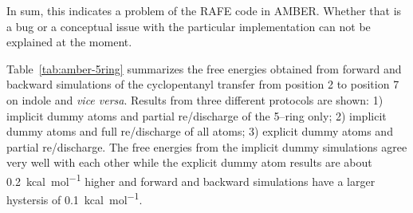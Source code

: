 \documentclass[journal=jctcce,manuscript=suppinfo]{achemso}
\begin{document}
In sum, this indicates a problem of the RAFE code in AMBER.  Whether that is a bug or a conceptual issue with the particular implementation can not be explained at the moment.

Table~\ref{tab:amber-5ring} summarizes the free energies obtained from forward 
and backward simulations of the cyclopentanyl transfer from position 2 to 
position 7 on indole and \emph{vice versa}.  Results from three different 
protocols are shown: 1) implicit dummy atoms and partial re/discharge of the 
5--ring only; 2) implicit dummy atoms and full re/discharge of all atoms; 3) 
explicit dummy atoms and partial re/discharge.  The free energies from the 
implicit dummy simulations agree very well with each other while the explicit 
dummy atom results are about \SI{0.2}{kcal.mol^{-1}} higher and forward and 
backward simulations have a larger hystersis of \SI{0.1}{kcal.mol^{-1}}.
\begin{table}
  \begin{minipage}{\linewidth}
    \caption{Free energies of hydration for the 2--cyclopentanylindole to 7--cyclopentanylindole case with three different protocols.  The data are averages over three runs.}\label{tab:amber-5ring}
  \end{minipage}
\end{table}
\end{document}
